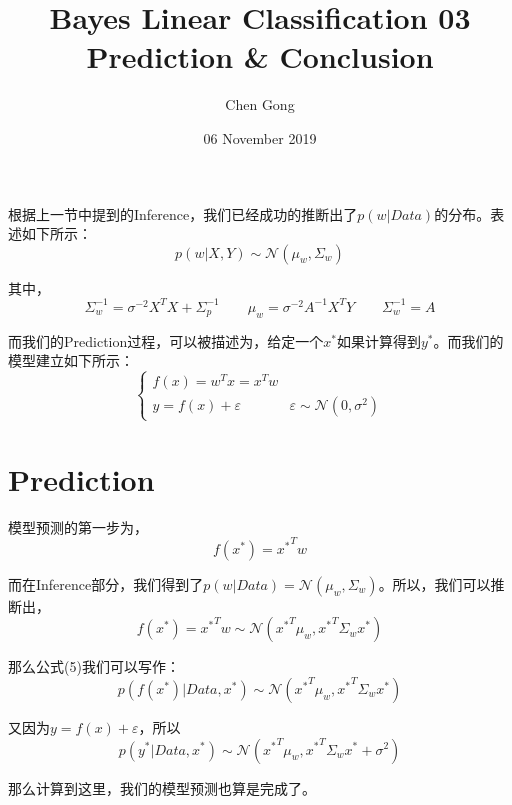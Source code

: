 \documentclass[a4paper]{article}
\title{Bayes Linear Classification 03 Prediction \& Conclusion}
\author{Chen Gong}
\date{06 November 2019}
\begin{document}
\maketitle
根据上一节中提到的Inference，我们已经成功的推断出了$p(w|Data)$的分布。表述如下所示：
\begin{equation}
    p(w|X,Y) \sim \mathcal{N}(\mu_w, \Sigma_w)
\end{equation}

其中，
\begin{equation}
    \Sigma_w^{-1}=\sigma^{-2}X^TX+\Sigma_p^{-1} \qquad \mu_w = \sigma^{-2}A^{-1}X^TY \qquad \Sigma_w^{-1}=A
\end{equation}

而我们的Prediction过程，可以被描述为，给定一个$x^\ast$如果计算得到$y^\ast$。而我们的模型建立如下所示：
\begin{equation}
\left\{
\begin{array}{ll}
      f(x)=w^Tx = x^Tw & \\
      y = f(x) + \varepsilon & \varepsilon \sim \mathcal{N}(0,\sigma^2)
\end{array}
\right.    
\end{equation}

\section{Prediction}
模型预测的第一步为，
\begin{equation}
    f(x^\ast) = {x^\ast}^T w 
\end{equation}

而在Inference部分，我们得到了$p(w|Data)= \mathcal{N}(\mu_w,\Sigma_w)$。所以，我们可以推断出，
\begin{equation}
    f(x^\ast) = {x^\ast}^T w \sim \mathcal{N}({x^\ast}^T\mu_w, {x^\ast}^T\Sigma_w{x^\ast})
\end{equation}

那么公式(5)我们可以写作：
\begin{equation}
    p(f(x^\ast)|Data,x^\ast) \sim \mathcal{N}({x^\ast}^T\mu_w, {x^\ast}^T\Sigma_w{x^\ast})
\end{equation}

又因为$y = f(x) + \varepsilon$，所以
\begin{equation}
    p(y^\ast|Data,x^\ast) \sim \mathcal{N}({x^\ast}^T\mu_w, {x^\ast}^T\Sigma_w{x^\ast}+\sigma^2)
\end{equation}

那么计算到这里，我们的模型预测也算是完成了。
\end{document}
